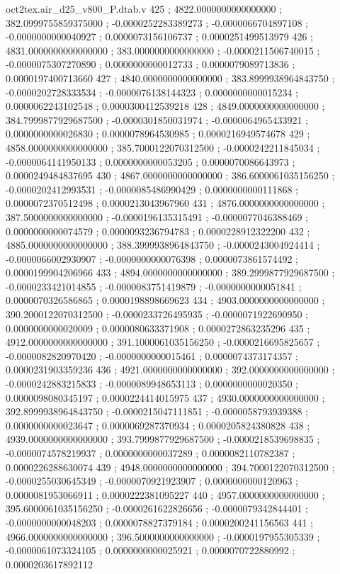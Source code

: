 \begin{filecontents}[overwrite]{oct2tex.air_d25_v800_P.dtab.v}
425 ; 4822.0000000000000000 ; 382.0999755859375000 ; -0.0000252283389273 ; -0.0000066704897108 ; -0.0000000000040927 ; 0.0000073156106737 ; 0.0000251499513979
426 ; 4831.0000000000000000 ; 383.0000000000000000 ; -0.0000211506740015 ; -0.0000075307270890 ; 0.0000000000012733 ; 0.0000079089713836 ; 0.0000197400713660
427 ; 4840.0000000000000000 ; 383.8999938964843750 ; -0.0000202728333534 ; -0.0000076138144323 ; 0.0000000000015234 ; 0.0000062243102548 ; 0.0000300412539218
428 ; 4849.0000000000000000 ; 384.7999877929687500 ; -0.0000301850031974 ; -0.0000064965433921 ; 0.0000000000026830 ; 0.0000078964530985 ; 0.0000216949574678
429 ; 4858.0000000000000000 ; 385.7000122070312500 ; -0.0000242211845034 ; -0.0000064141950133 ; 0.0000000000053205 ; 0.0000070086643973 ; 0.0000249484837695
430 ; 4867.0000000000000000 ; 386.6000061035156250 ; -0.0000202412993531 ; -0.0000085486990429 ; 0.0000000000111868 ; 0.0000072370512498 ; 0.0000213043967960
431 ; 4876.0000000000000000 ; 387.5000000000000000 ; -0.0000196135315491 ; -0.0000077046388469 ; 0.0000000000074579 ; 0.0000093236794783 ; 0.0000228912322200
432 ; 4885.0000000000000000 ; 388.3999938964843750 ; -0.0000243004924414 ; -0.0000066002930907 ; -0.0000000000076398 ; 0.0000073861574492 ; 0.0000199904206966
433 ; 4894.0000000000000000 ; 389.2999877929687500 ; -0.0000233421014855 ; -0.0000083751419879 ; -0.0000000000051841 ; 0.0000070326586865 ; 0.0000198898669623
434 ; 4903.0000000000000000 ; 390.2000122070312500 ; -0.0000233726495935 ; -0.0000071922690950 ; 0.0000000000020009 ; 0.0000080633371908 ; 0.0000272863235296
435 ; 4912.0000000000000000 ; 391.1000061035156250 ; -0.0000216695825657 ; -0.0000082820970420 ; -0.0000000000015461 ; 0.0000074373174357 ; 0.0000231903359236
436 ; 4921.0000000000000000 ; 392.0000000000000000 ; -0.0000242883215833 ; -0.0000089948653113 ; 0.0000000000020350 ; 0.0000098080345197 ; 0.0000224414015975
437 ; 4930.0000000000000000 ; 392.8999938964843750 ; -0.0000215047111851 ; -0.0000058793939388 ; 0.0000000000023647 ; 0.0000069287370934 ; 0.0000205824380828
438 ; 4939.0000000000000000 ; 393.7999877929687500 ; -0.0000218539698835 ; -0.0000074578219937 ; 0.0000000000037289 ; 0.0000082110782387 ; 0.0000226288630074
439 ; 4948.0000000000000000 ; 394.7000122070312500 ; -0.0000255030645349 ; -0.0000070921923907 ; 0.0000000000120963 ; 0.0000081953066911 ; 0.0000222381095227
440 ; 4957.0000000000000000 ; 395.6000061035156250 ; -0.0000261622826656 ; -0.0000079342844401 ; -0.0000000000048203 ; 0.0000078827379184 ; 0.0000200241156563
441 ; 4966.0000000000000000 ; 396.5000000000000000 ; -0.0000197955305339 ; -0.0000061073324105 ; 0.0000000000025921 ; 0.0000070722880992 ; 0.0000203617892112

\end{filecontents}
